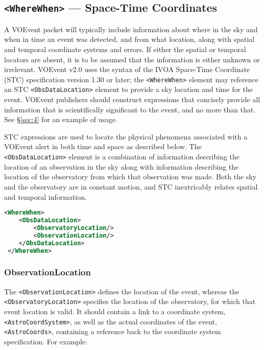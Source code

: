 \documentclass[11pt,a4paper]{ivoa}
\begin{document}
\subsection{{\tt <WhereWhen>} --- Space-Time Coordinates}
\label{sec:3.4}

A VOEvent packet will typically include information about where in the sky and
when in time an event was detected, and from what location, along with spatial
and temporal coordinate systems and errors. If either the spatial or temporal
locators are absent, it is to be assumed that the information is either unknown
or irrelevant. VOEvent v2.0 uses the syntax of the IVOA Space-Time Coordinate
(STC) specification version 1.30 or later; the {\tt <WhereWhen>} element may
reference an STC \citep{2007ivoa.spec.1030R} {\tt <ObsDataLocation>} element to
provide a sky location and time for the event. VOEvent publishers should
construct expressions that concisely provide all information that is
scientifically significant to the event, and no more than that. See
\S\ref{sec:4} for an example of usage.

STC expressions are used to locate the physical phenomena associated with a
VOEvent alert in both time and space as described below. The {\tt
<ObsDataLocation>} element is a combination of information describing the
location of an observation in the sky along with information describing the
location of the observatory from which that observation was made. Both the sky
and the observatory are in constant motion, and STC inextricably relates spatial
and temporal information.

\begin{lstlisting}[language=XML]
<WhereWhen>
    <ObsDataLocation>
        <ObservatoryLocation/>
        <ObservationLocation/>
    </ObsDataLocation>
 </WhereWhen>
\end{lstlisting}

\subsubsection{ObservationLocation}
\label{sec:3.4.1}

The {\tt <ObservationLocation>} defines the location of the event, whereas
the {\tt <ObservatoryLocation>} specifies the location of the observatory,
for which that event location is valid. It should contain a link to a
coordinate system, {\tt <AstroCoordSystem>}, as well as the actual coordinates
of the event, {\tt <AstroCoords>}, containing a reference back to the
coordinate system specification. For example:
\end{document}

